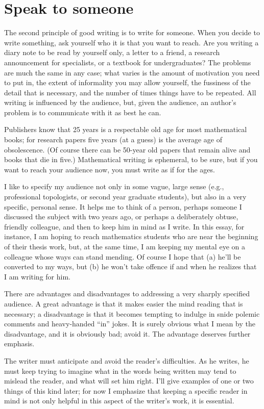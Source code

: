 \documentclass[12pt]{article}
\begin{document}
\section{Speak to someone}

The second principle of good writing is to write for someone. When you decide to write something, ask yourself who it is that you want to reach. Are you writing a diary note to be read by yourself only, a letter to a friend, a research announcement for specialists, or a textbook for undergraduates? The problems are much the same in any case; what varies is the amount of motivation you need to put in, the extent of informality you may allow yourself, the fussiness of the detail that is necessary, and the number of times things have to be repeated. All writing is influenced by the audience, but, given the audience, an author's problem is to communicate with it as best he can. 

Publishers know that 25 years is a respectable old age for most mathematical books; for research papers five years (at a guess) is the average age of obsolescence. (Of course there can be 50-year old papers that remain alive and books that die in five.) Mathematical writing is ephemeral, to be sure, but if you want to reach your audience now, you must write as if for the ages. 

I like to specify my audience not only in some vague, large sense (e.g., professional topologists, or second year graduate students), but also in a very specific, personal sense. It helps me to think of a person, perhaps someone I discussed the subject with two years ago, or perhaps a deliberately obtuse, friendly colleague, and then to keep him in mind as I write. In this essay, for instance, I am hoping to reach mathematics students who are near the beginning of their thesis work, but, at the same time, I am keeping my mental eye on a colleague whose ways can stand mending. Of course I hope that (a) he'll be converted to my ways, but (b) he won't take offence if and when he realizes that I am writing for him. 

There are advantages and disadvantages to addressing a very sharply specified audience. A great advantage is that it makes easier the mind reading that is necessary; a disadvantage is that it becomes tempting to indulge in snide polemic comments and heavy-handed ``in'' jokes. It is surely obvious what I mean by the disadvantage, and it is obviously bad; avoid it. The advantage deserves further emphasis.

The writer must anticipate and avoid the reader's difficulties. As he writes, he must keep trying to imagine what in the words being written may tend to mislead the reader, and what will set him right. I'll give examples of one or two things of this kind later; for now I emphasize that keeping a specific reader in mind is not only helpful in this aspect of the writer's work, it is essential. 
\end{document}
